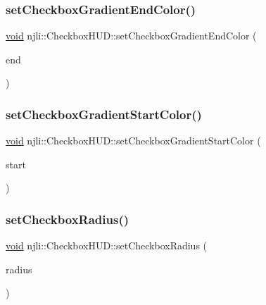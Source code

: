 \subsubsection{\texorpdfstring{set\+Checkbox\+Gradient\+End\+Color()}{setCheckboxGradientEndColor()}}
{\footnotesize\ttfamily \mbox{\hyperlink{_thread_8h_af1e856da2e658414cb2456cb6f7ebc66}{void}} njli\+::\+Checkbox\+H\+U\+D\+::set\+Checkbox\+Gradient\+End\+Color (\begin{DoxyParamCaption}\item[{const bt\+Vector4 \&}]{end }\end{DoxyParamCaption})}

\mbox{\label{classnjli_1_1_checkbox_h_u_d_ac96f62891f59b1f56285b1aeb8dcefb0}} 
\subsubsection{\texorpdfstring{set\+Checkbox\+Gradient\+Start\+Color()}{setCheckboxGradientStartColor()}}
{\footnotesize\ttfamily \mbox{\hyperlink{_thread_8h_af1e856da2e658414cb2456cb6f7ebc66}{void}} njli\+::\+Checkbox\+H\+U\+D\+::set\+Checkbox\+Gradient\+Start\+Color (\begin{DoxyParamCaption}\item[{const bt\+Vector4 \&}]{start }\end{DoxyParamCaption})}

\mbox{\label{classnjli_1_1_checkbox_h_u_d_ae3f929ce57043944b8193b5e82396fd5}} 
\subsubsection{\texorpdfstring{set\+Checkbox\+Radius()}{setCheckboxRadius()}}
{\footnotesize\ttfamily \mbox{\hyperlink{_thread_8h_af1e856da2e658414cb2456cb6f7ebc66}{void}} njli\+::\+Checkbox\+H\+U\+D\+::set\+Checkbox\+Radius (\begin{DoxyParamCaption}\item[{\mbox{\hyperlink{_util_8h_a5f6906312a689f27d70e9d086649d3fd}{f32}}}]{radius }\end{DoxyParamCaption})}

